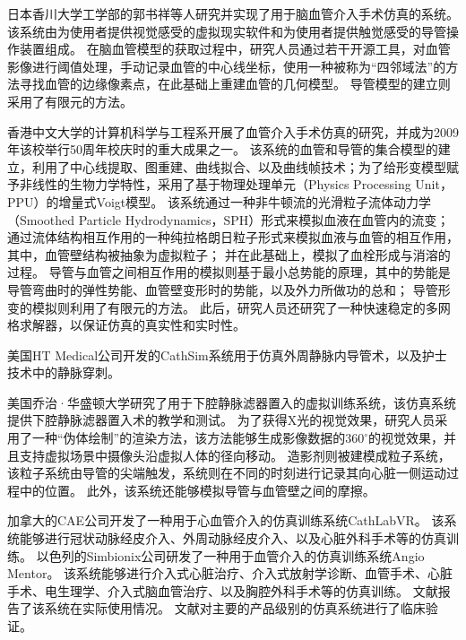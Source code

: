 日本香川大学工学部的郭书祥等人研究并实现了用于脑血管介入手术仿真的系统\cite{Gao2012aGUO}\cite{Gao2012bGUO}\cite{Gao2012cGUO}。
该系统由为使用者提供视觉感受的虚拟现实软件和为使用者提供触觉感受的导管操作装置组成\cite{Gao2012aGUO}。
在脑血管模型的获取过程中，研究人员通过若干开源工具，对血管影像进行阈值处理，手动记录血管的中心线坐标，使用一种被称为“四邻域法”的方法寻找血管的边缘像素点，在此基础上重建血管的几何模型\cite{Gao2012bGUO}。
导管模型的建立则采用了有限元的方法\cite{Gao2012cGUO}。

香港中文大学的计算机科学与工程系开展了血管介入手术仿真的研究\cite{guo2007CUHK}\cite{Chui2010CUHK}\cite{Li2011CUHK}\cite{Li2012CUHK}，并成为2009年该校举行50周年校庆时的重大成果之一\cite{cuhkweb}。
该系统的血管和导管的集合模型的建立，利用了中心线提取、图重建、曲线拟合、以及曲线帧技术；为了给形变模型赋予非线性的生物力学特性，采用了基于物理处理单元（Physics Processing Unit，PPU）的增量式Voigt模型\cite{guo2007CUHK}。
该系统通过一种非牛顿流的光滑粒子流体动力学（Smoothed Particle Hydrodynamics，SPH）形式来模拟血液在血管内的流变；
通过流体结构相互作用的一种纯拉格朗日粒子形式来模拟血液与血管的相互作用，其中，血管壁结构被抽象为虚拟粒子；
并在此基础上，模拟了血栓形成与消溶的过程\cite{Chui2010CUHK}。
导管与血管之间相互作用的模拟则基于最小总势能的原理，其中的势能是导管弯曲时的弹性势能、血管壁变形时的势能，以及外力所做功的总和；
导管形变的模拟则利用了有限元的方法\cite{Li2011CUHK}。
此后，研究人员还研究了一种快速稳定的多网格求解器，以保证仿真的真实性和实时性\cite{Li2012CUHK}。

美国HT Medical公司开发的CathSim系统用于仿真外周静脉内导管术\cite{ursino1999cathsim}，以及护士技术中的静脉穿刺\cite{Barker1999CathSim}。

美国乔治·华盛顿大学研究了用于下腔静脉滤器置入的虚拟训练系统\cite{Hahn1998GWU}，该仿真系统提供下腔静脉滤器置入术的教学和测试。
为了获得X光的视觉效果，研究人员采用了一种“伪体绘制”的渲染方法\cite{Park1996GWU}，该方法能够生成影像数据的$360^\circ$的视觉效果，并且支持虚拟场景中摄像头沿虚拟人体的径向移动。
造影剂则被建模成粒子系统，该粒子系统由导管的尖端触发，系统则在不同的时刻进行记录其向心脏一侧运动过程中的位置\cite{Hahn1998GWU}。
此外，该系统还能够模拟导管与血管壁之间的摩擦\cite{Hahn1998GWU}。

加拿大的CAE公司开发了一种用于心血管介入的仿真训练系统CathLabVR\cite{caeweb}。
该系统能够进行冠状动脉经皮介入、外周动脉经皮介入、以及心脏外科手术等的仿真训练。
以色列的Simbionix公司研发了一种用于血管介入的仿真训练系统Angio Mentor\cite{simbionixweb}。
该系统能够进行介入式心脏治疗、介入式放射学诊断、血管手术、心脏手术、电生理学、介入式脑血管治疗、以及胸腔外科手术等的仿真训练。
文献\cite{hislop2009Simbionix}\cite{Lee2012Simbionix}报告了该系统在实际使用情况。
文献\cite{Petri2013Comparison}对主要的产品级别的仿真系统进行了临床验证。

